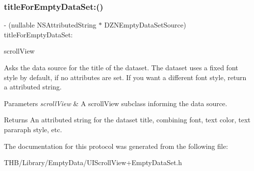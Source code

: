 \subsubsection{\texorpdfstring{title\+For\+Empty\+Data\+Set\+:()}{titleForEmptyDataSet:()}}
{\footnotesize\ttfamily -\/ (nullable N\+S\+Attributed\+String $\ast$ D\+Z\+N\+Empty\+Data\+Set\+Source) title\+For\+Empty\+Data\+Set\+: \begin{DoxyParamCaption}\item[{(U\+I\+Scroll\+View $\ast$)}]{scroll\+View }\end{DoxyParamCaption}\hspace{0.3cm}{\ttfamily [optional]}}

Asks the data source for the title of the dataset. The dataset uses a fixed font style by default, if no attributes are set. If you want a different font style, return a attributed string.


\begin{DoxyParams}{Parameters}
{\em scroll\+View} & A scroll\+View subclass informing the data source. \\
\hline
\end{DoxyParams}
\begin{DoxyReturn}{Returns}
An attributed string for the dataset title, combining font, text color, text pararaph style, etc. 
\end{DoxyReturn}


The documentation for this protocol was generated from the following file\+:\begin{DoxyCompactItemize}
\item 
T\+H\+B/\+Library/\+Empty\+Data/U\+I\+Scroll\+View+\+Empty\+Data\+Set.\+h\end{DoxyCompactItemize}
